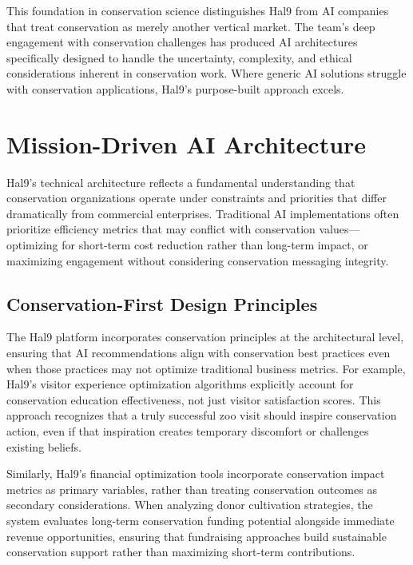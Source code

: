 \documentclass[
  Letterpaper,
]{scrbook}
\begin{document}
This foundation in conservation science distinguishes Hal9 from AI
companies that treat conservation as merely another vertical market. The
team's deep engagement with conservation challenges has produced AI
architectures specifically designed to handle the uncertainty,
complexity, and ethical considerations inherent in conservation work.
Where generic AI solutions struggle with conservation applications,
Hal9's purpose-built approach excels.

\section{Mission-Driven AI
Architecture}\label{mission-driven-ai-architecture}

Hal9's technical architecture reflects a fundamental understanding that
conservation organizations operate under constraints and priorities that
differ dramatically from commercial enterprises. Traditional AI
implementations often prioritize efficiency metrics that may conflict
with conservation values---optimizing for short-term cost reduction
rather than long-term impact, or maximizing engagement without
considering conservation messaging integrity.

\subsection{Conservation-First Design
Principles}\label{conservation-first-design-principles}

The Hal9 platform incorporates conservation principles at the
architectural level, ensuring that AI recommendations align with
conservation best practices even when those practices may not optimize
traditional business metrics. For example, Hal9's visitor experience
optimization algorithms explicitly account for conservation education
effectiveness, not just visitor satisfaction scores. This approach
recognizes that a truly successful zoo visit should inspire conservation
action, even if that inspiration creates temporary discomfort or
challenges existing beliefs.

Similarly, Hal9's financial optimization tools incorporate conservation
impact metrics as primary variables, rather than treating conservation
outcomes as secondary considerations. When analyzing donor cultivation
strategies, the system evaluates long-term conservation funding
potential alongside immediate revenue opportunities, ensuring that
fundraising approaches build sustainable conservation support rather
than maximizing short-term contributions.
\end{document}
